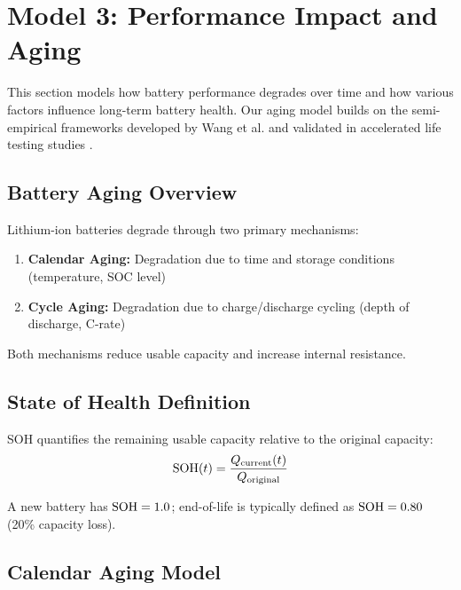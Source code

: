 \section{Model 3: Performance Impact and Aging}
\label{sec:model3}

This section models how battery performance degrades over time and how various factors influence long-term battery health. Our aging model builds on the semi-empirical frameworks developed by Wang et al. \cite{Wang2014} and validated in accelerated life testing studies \cite{Bloom2001}.

\subsection{Battery Aging Overview}
\label{subsec:aging_overview}

Lithium-ion batteries degrade through two primary mechanisms:

\begin{enumerate}
    \item \textbf{Calendar Aging:} Degradation due to time and storage conditions (temperature, SOC level)
    \item \textbf{Cycle Aging:} Degradation due to charge/discharge cycling (depth of discharge, C-rate)
\end{enumerate}

Both mechanisms reduce usable capacity and increase internal resistance.

\subsection{State of Health Definition}
\label{subsec:soh_def}

\begin{definition}
SOH quantifies the remaining usable capacity relative to the original capacity:
\begin{equation}
    \text{SOH}(t) = \frac{Q_{\text{current}}(t)}{Q_{\text{original}}}
    \label{eq:soh_def}
\end{equation}
\end{definition}

A new battery has $\text{SOH} = 1.0$; end-of-life is typically defined as $\text{SOH} = 0.80$ (20\% capacity loss).

\subsection{Calendar Aging Model}
\label{subsec:calendar_aging}

